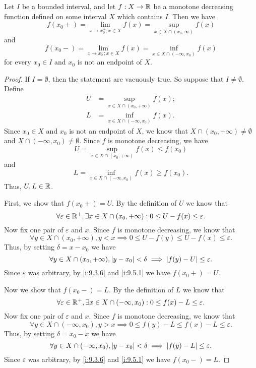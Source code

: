 \begin{ac}\label{i:ac:11.8.2}
  Let \(I\) be a bounded interval, and let \(f : X \to \mathbb{R}\) be a monotone decreasing function defined on some interval \(X\) which contains \(I\).
  Then we have
  \[
    f(x_0+) = \lim_{x \to x_0^+ ; x \in X} f(x) = \sup_{x \in X \cap (x_0, \infty)} f(x)
  \]
  and
  \[
    f(x_0-) = \lim_{x \to x_0^- ; x \in X} f(x) = \inf_{x \in X \cap (-\infty, x_0)} f(x)
  \]
  for every \(x_0 \in I\) and \(x_0\) is not an endpoint of \(X\).
\end{ac}

\begin{proof}
  If \(I = \emptyset\), then the statement are vacuously true.
  So suppose that \(I \neq \emptyset\).
  Define
  \begin{align*}
    U & = \sup_{x \in X \cap (x_0, +\infty)} f(x); \\
    L & = \inf_{x \in X \cap (-\infty, x_0)} f(x).
  \end{align*}
  Since \(x_0 \in X\) and \(x_0\) is not an endpoint of \(X\), we know that \(X \cap (x_0, +\infty) \neq \emptyset\) and \(X \cap (-\infty, x_0) \neq \emptyset\).
  Since \(f\) is monotone decreasing, we have
  \[
    U = \sup_{x \in X \cap (x_0, +\infty)} f(x) \leq f(x_0)
  \]
  and
  \[
    L = \inf_{x \in X \cap (-\infty, x_0)} f(x) \geq f(x_0).
  \]
  Thus, \(U, L \in \mathbb{R}\).

  First, we show that \(f(x_0+) = U\).
  By the definition of \(U\) we know that
  \[
    \forall \varepsilon \in \mathbb{R}^+, \exists x \in X \cap (x_0, +\infty) : 0 \leq U - f(x) \leq \varepsilon.
  \]
  Now fix one pair of \(\varepsilon\) and \(x\).
  Since \(f\) is monotone decreasing, we know that
  \[
    \forall y \in X \cap (x_0, +\infty), y < x \implies 0 \leq U - f(y) \leq U - f(x) \leq \varepsilon.
  \]
  Thus, by setting \(\delta = x - x_0\) we have
  \[
    \forall y \in X \cap (x_0, +\infty), \left\lvert y - x_0\right\rvert < \delta \implies \left\lvert f(y) - U\right\rvert \leq \varepsilon.
  \]
  Since \(\varepsilon\) was arbitrary, by \cref{i:9.3.6} and \cref{i:9.5.1} we have \(f(x_0+) = U\).

  Now we show that \(f(x_0-) = L\).
  By the definition of \(L\) we know that
  \[
    \forall \varepsilon \in \mathbb{R}^+, \exists x \in X \cap (-\infty, x_0) : 0 \leq f(x) - L \leq \varepsilon.
  \]
  Now fix one pair of \(\varepsilon\) and \(x\).
  Since \(f\) is monotone decreasing, we know that
  \[
    \forall y \in X \cap (-\infty, x_0), y > x \implies 0 \leq f(y) - L \leq f(x) - L \leq \varepsilon.
  \]
  Thus, by setting \(\delta = x_0 - x\) we have
  \[
    \forall y \in X \cap (-\infty, x_0), \left\lvert y - x_0\right\rvert < \delta \implies \left\lvert f(y) - L\right\rvert \leq \varepsilon.
  \]
  Since \(\varepsilon\) was arbitrary, by \cref{i:9.3.6} and \cref{i:9.5.1} we have \(f(x_0-) = L\).
\end{proof}

